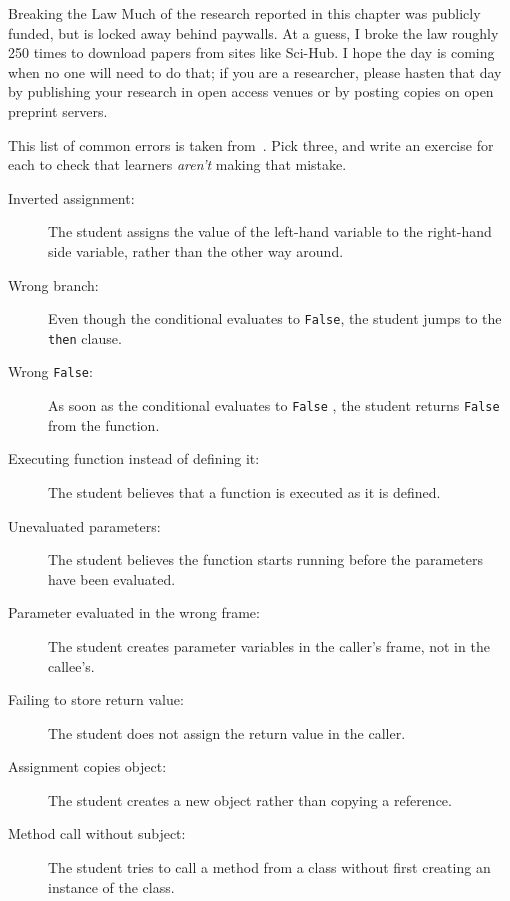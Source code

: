 \begin{aside}{Breaking the Law}
  Much of the research reported in this chapter was publicly funded,
  but is locked away behind paywalls.
  At a guess,
  I broke the law roughly 250 times to download papers from sites like Sci-Hub.
  I hope the day is coming when no one will need to do that;
  if you are a researcher,
  please hasten that day by publishing your research in open access venues
  or by posting copies on open preprint servers.
\end{aside}



This list of common errors is taken from~\cite{Sirk2012}. Pick three,
and write an exercise for each to check that learners \emph{aren't} making
that mistake.

\begin{description}
\item[Inverted assignment:]
The student assigns the value of the left-hand variable to the
right-hand side variable, rather than the other way around.
\item[Wrong branch:]
Even though the conditional evaluates to \texttt{False}, the student jumps
to the \texttt{then} clause.
\item[Wrong \texttt{False}:]
As soon as the conditional evaluates to \texttt{False} , the student
returns \texttt{False} from the function.
\item[Executing function instead of defining it:]
The student believes that a function is executed as it is defined.
\item[Unevaluated parameters:]
The student believes the function starts running before the
parameters have been evaluated.
\item[Parameter evaluated in the wrong frame:]
The student creates parameter variables in the caller's frame, not
in the callee's.
\item[Failing to store return value:]
The student does not assign the return value in the caller.
\item[Assignment copies object:]
The student creates a new object rather than copying a reference.
\item[Method call without subject:]
The student tries to call a method from a class without first
creating an instance of the class.
\end{description}


